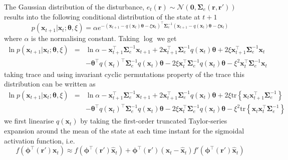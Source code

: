\documentclass[]{article}
\begin{document}
The Gaussian distribution of the disturbance, $e_t(\mathbf r)\sim \mathcal N(\mathbf 0,\boldsymbol\Sigma_e(\mathbf r,\mathbf r'))$ results into the following conditional distribution of the state at $t+1$
\begin{equation}
 p(\mathbf x_{t+1} | \mathbf x_t;\boldsymbol\theta,\xi)=\alpha e^{-(\mathbf x_{t+1}-q(\mathbf  x_t)\boldsymbol\theta-\xi  \mathbf x_t)^\top\boldsymbol\Sigma_e^{-1}(\mathbf x_{t+1}-q( \mathbf x_t)\boldsymbol\theta-\xi \mathbf  x_t)}
\end{equation}
where $\alpha$ is the normalising constant. Taking $\log$ we get
\begin{eqnarray}\label{eq:Qfunction}
  \ln p(\mathbf x_{t+1} | \mathbf x_t;\boldsymbol\theta,\xi)&=&\ln \alpha-\mathbf x_{t+1}^\top\boldsymbol\Sigma_e^{-1}\mathbf x_{t+1}+2\mathbf x_{t+1}^\top\boldsymbol\Sigma_e^{-1}q( \mathbf x_t)\boldsymbol\theta+2\xi \mathbf x_{t+1}^\top\boldsymbol\Sigma_e^{-1}\mathbf x_t\nonumber \\
&&-\boldsymbol\theta^\top q(\mathbf x_t)^\top\boldsymbol\Sigma_e^{-1}q(\mathbf x_t)\boldsymbol\theta-2\xi \mathbf x_t^\top\boldsymbol\Sigma_e^{-1}q(\mathbf x_t)\boldsymbol\theta-\xi^2\mathbf x_t^\top\boldsymbol\Sigma_e^{-1}\mathbf x_t
\end{eqnarray}
taking trace and using invariant cyclic permutations property of the trace this distribution can be written
as
\begin{eqnarray}\label{eq:Qfunctionintrace}
  \ln p(\mathbf x_{t+1} | \mathbf x_t;\boldsymbol\theta,\xi)&=&\ln \alpha-\mathbf x_{t+1}^\top\boldsymbol\Sigma_e^{-1}\mathbf x_{t+1}+2\mathbf x_{t+1}^\top\boldsymbol\Sigma_e^{-1}q( \mathbf x_t)\boldsymbol\theta+2\xi \mathrm{tr} \left\lbrace \mathbf x_t\mathbf x_{t+1}^\top\boldsymbol\Sigma_e^{-1}\right\rbrace \nonumber \\
&&-\boldsymbol\theta^\top q(\mathbf x_t)^\top\boldsymbol\Sigma_e^{-1}q(\mathbf x_t)\boldsymbol\theta-2\xi \mathbf x_t^\top\boldsymbol\Sigma_e^{-1}q(\mathbf x_t)\boldsymbol\theta-\xi^2\mathrm{tr}\left\lbrace \mathbf x_t \mathbf x_t^\top\boldsymbol\Sigma_e^{-1}\right\rbrace 
\end{eqnarray}
we first linearise $q(\mathbf x_t)$ by taking the first-order truncated  Taylor-series expansion around the mean of the state at each time instant for the sigmoidal activation function, i.e.
\begin{equation}
 f(\boldsymbol \phi^\top(\mathbf r')\mathbf x_t) \approx f(\boldsymbol \phi^\top(\mathbf r')\mathbf {\hat x}_t)+  \boldsymbol \phi^\top(\mathbf r')(\mathbf x_t - \mathbf  {\hat x}_t)f'(\boldsymbol \phi^\top(\mathbf r')\mathbf {\hat x}_t)
\end{equation}
\end{document}
